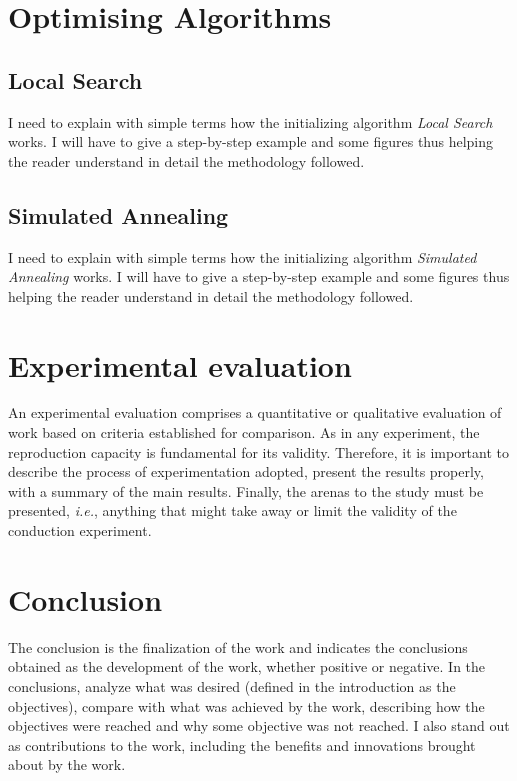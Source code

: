 \documentclass[12pt]{article}
\begin{document}
	
	
	\section{Optimising Algorithms}
	\label{sec:optimising_algorithms}
    \subsection{Local Search}
	
	I need to explain with simple terms how the initializing algorithm \emph{Local Search} works. I will have to give a step-by-step example and some figures thus helping the reader understand in detail the methodology followed.

    \subsection{Simulated Annealing}
    I need to explain with simple terms how the initializing algorithm \emph{Simulated Annealing} works. I will have to give a step-by-step example and some figures thus helping the reader understand in detail the methodology followed.
	
	\section{Experimental evaluation}
	\label{sec:aval_exp}
	
	An experimental evaluation comprises a quantitative or qualitative evaluation of work based on criteria established for comparison. As in any experiment, the reproduction capacity is fundamental for its validity. Therefore, it is important to describe the process of experimentation adopted, present the results properly, with a summary of the main results. Finally, the arenas to the study must be presented, \emph{i.e.}, anything that might take away or limit the validity of the conduction experiment.
	
	\section{Conclusion}
	\label{sec:Conclusion}
	
	The conclusion is the finalization of the work and indicates the conclusions obtained as the development of the work, whether positive or negative. In the conclusions, analyze what was desired (defined in the introduction as the objectives), compare with what was achieved by the work, describing how the objectives were reached and why some objective was not reached. I also stand out as contributions to the work, including the benefits and innovations brought about by the work.
\end{document}
